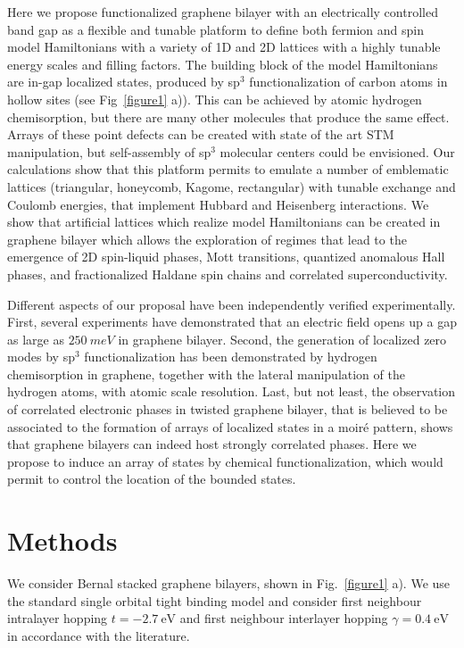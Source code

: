 Here we propose functionalized graphene bilayer with an electrically controlled band gap as a flexible and tunable platform to define both fermion and spin model Hamiltonians with a variety of 1D and 2D lattices with a highly tunable energy scales and filling factors.
The building block of the model Hamiltonians are in-gap localized states, produced by sp$^3$ functionalization of carbon atoms in hollow sites (see Fig~\ref{figure1} a)). This can be achieved by atomic hydrogen chemisorption\cite{Brihuega2016}, but there are many other molecules that produce the same effect\cite{Santos2012a}.
Arrays of these point defects can be created with state of the art STM manipulation,\cite{Brihuega2016} but self-assembly of sp$^3$ molecular centers could be envisioned.
Our calculations show that this platform permits to emulate a number of emblematic lattices (triangular, honeycomb, Kagome, rectangular)
with tunable exchange and Coulomb energies, that implement Hubbard and Heisenberg interactions. %
We show that artificial lattices which realize model Hamiltonians can be created in graphene bilayer which allows the exploration of regimes that lead to the emergence of 2D spin-liquid phases, Mott transitions, quantized anomalous Hall phases, and fractionalized Haldane spin chains and correlated superconductivity. 
 
Different aspects of our proposal have been independently verified experimentally. First, several experiments have demonstrated that an electric field opens up a gap as large as $\SI{250}{meV}$ in graphene bilayer\cite{Castro2007, Zhang2009, Taychatanapat2010}. Second, the generation of localized zero modes by sp$^3$ functionalization has been demonstrated by hydrogen chemisorption in graphene\cite{Brihuega2016}, together with the lateral manipulation of the hydrogen atoms, with atomic scale resolution\cite{Ugeda2011,Brihuega2016}. Last, but not least, the observation of correlated electronic phases in twisted graphene bilayer\cite{Cao2018a, Cao2018b}, %
that is believed to be associated to the formation of arrays of localized states in a moiré pattern\cite{}, shows that graphene bilayers can indeed host strongly correlated phases.
Here we propose to induce an array of states by chemical functionalization, which would permit to control the location of the bounded states. 
 
\section{Methods}
We consider Bernal stacked graphene bilayers, shown in Fig.~\ref{figure1} a). We use the standard single orbital tight binding model\cite{McCann2012} and consider first neighbour intralayer hopping $t=\SI{-2.7}{\eV}$ and first neighbour interlayer hopping $\gamma=\SI{0.4}{\eV}$ in accordance with the literature\cite{KatsnelsonBook}.

